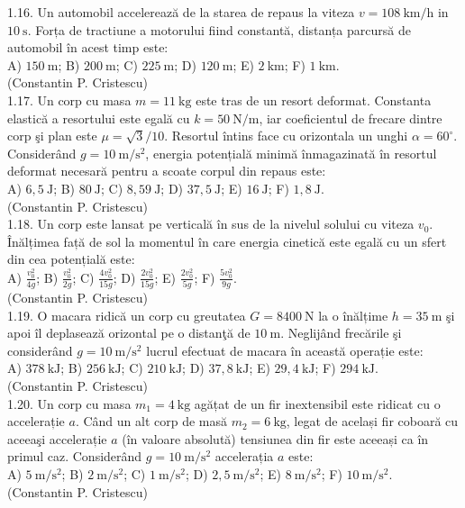 1.16. Un automobil accelerează de la starea de repaus la viteza $v=108 \mathrm{~km} / \mathrm{h}$ in $10 \mathrm{~s}$. Forța de tractiune a motorului fiind constantă, distanța parcursă de automobil în acest timp este:\\ A) $150 \mathrm{~m}$; B) $200 \mathrm{~m}$; C) $225 \mathrm{~m}$; D) $120 \mathrm{~m}$; E) $2 \mathrm{~km}$; F) $1 \mathrm{~km}$.\\ (Constantin P. Cristescu)\\

1.17. Un corp cu masa $m=11 \mathrm{~kg}$ este tras de un resort deformat. Constanta elastică a resortului este egală cu $k=50 \mathrm{~N} / \mathrm{m}$, iar coeficientul de frecare dintre corp şi plan este $\mu=\sqrt{3} / 10$. Resortul întins face cu orizontala un unghi $\alpha=60^{\circ}$. Considerând $g=10 \mathrm{~m} / \mathrm{s}^{2}$, energia potențială minimă înmagazinată în resortul deformat necesară pentru a scoate corpul din repaus este:\\ A) $6,5 \mathrm{~J}$; B) $80 \mathrm{~J}$; C) $8,59 \mathrm{~J}$; D) $37,5 \mathrm{~J}$; E) $16 \mathrm{~J}$; F) $1,8 \mathrm{~J}$.\\ (Constantin P. Cristescu)\\

1.18. Un corp este lansat pe verticală în sus de la nivelul solului cu viteza $v_{0}$. Înălțimea față de sol la momentul în care energia cinetică este egală cu un sfert din cea potențială este:\\ A) $\frac{v_{0}^{2}}{4 g}$; B) $\frac{v_{0}^{2}}{2 g}$; C) $\frac{4 v_{0}^{2}}{15 g}$; D) $\frac{2 v_{0}^{2}}{15 g}$; E) $\frac{2 v_{0}^{2}}{5 g}$; F) $\frac{5 v_{0}^{2}}{9 g}$.\\ (Constantin P. Cristescu)\\

1.19. O macara ridică un corp cu greutatea $G=8400 \mathrm{~N}$ la o înălțime $h=35 \mathrm{~m}$ şi apoi îl deplasează orizontal pe o distanţă de $10 \mathrm{~m}$. Neglijând frecările şi considerând $g=10 \mathrm{~m} / \mathrm{s}^{2}$ lucrul efectuat de macara în această operație este:\\ A) $378 \mathrm{~kJ}$; B) $256 \mathrm{~kJ}$; C) $210 \mathrm{~kJ}$; D) $37,8 \mathrm{~kJ}$; E) $29,4 \mathrm{~kJ}$; F) $294 \mathrm{~kJ}$.\\ (Constantin P. Cristescu)\\

1.20. Un corp cu masa $m_{1}=4 \mathrm{~kg}$ agățat de un fir inextensibil este ridicat cu o accelerație $a$. Când un alt corp de masă $m_{2}=6 \mathrm{~kg}$, legat de același fir coboară cu aceeaşi accelerație $a$ (în valoare absolută) tensiunea din fir este aceeași ca în primul caz. Considerând $g=10 \mathrm{~m} / \mathrm{s}^{2}$ accelerația $a$ este:\\ A) $5 \mathrm{~m} / \mathrm{s}^{2}$; B) $2 \mathrm{~m} / \mathrm{s}^{2}$; C) $1 \mathrm{~m} / \mathrm{s}^{2}$; D) $2,5 \mathrm{~m} / \mathrm{s}^{2}$; E) $8 \mathrm{~m} / \mathrm{s}^{2}$; F) $10 \mathrm{~m} / \mathrm{s}^{2}$.\\ (Constantin P. Cristescu)\\


